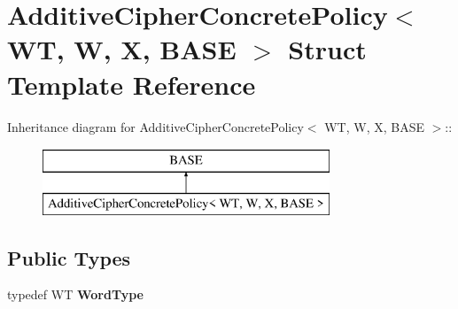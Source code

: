 \hypertarget{struct_additive_cipher_concrete_policy}{
\section{AdditiveCipherConcretePolicy$<$ WT, W, X, BASE $>$ Struct Template Reference}
\label{struct_additive_cipher_concrete_policy}
}
Inheritance diagram for AdditiveCipherConcretePolicy$<$ WT, W, X, BASE $>$::\begin{figure}[H]
\begin{center}
\leavevmode
\includegraphics[height=2cm]{struct_additive_cipher_concrete_policy}
\end{center}
\end{figure}
\subsection*{Public Types}
\begin{DoxyCompactItemize}
\item 
\hypertarget{struct_additive_cipher_concrete_policy_a94149b18cb6bf530f196ba0132ba904f}{
typedef WT {\bfseries WordType}}
\label{struct_additive_cipher_concrete_policy_a94149b18cb6bf530f196ba0132ba904f}

\end{DoxyCompactItemize}
